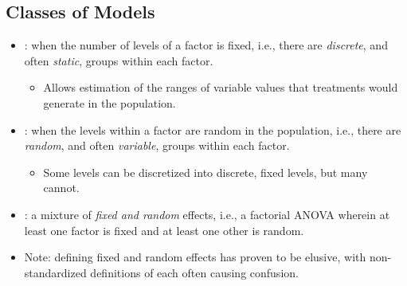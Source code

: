 \begin{itemize}
  \subsection{Classes of Models}
  \begin{itemize}
    \item {}: when the number of levels of a factor is fixed, i.e., there are \emph{discrete}, and often \emph{static}, groups within each factor.
      \begin{itemize}
        \item Allows estimation of the ranges of  variable values that treatments would generate in the population.
      \end{itemize}
    \item {}: when the levels within a factor are random in the population, i.e., there are \emph{random}, and often \emph{variable}, groups within each factor.
      \begin{itemize}
        \item Some levels can be discretized into discrete, fixed levels, but many cannot.
      \end{itemize}
    \item {}: a mixture of \emph{fixed and random} effects, i.e., a factorial ANOVA wherein at least one factor is fixed and at least one other is random.
    \item Note: defining fixed and random effects has proven to be elusive, with non-standardized definitions of each often causing confusion.
  \end{itemize}


\end{itemize}
